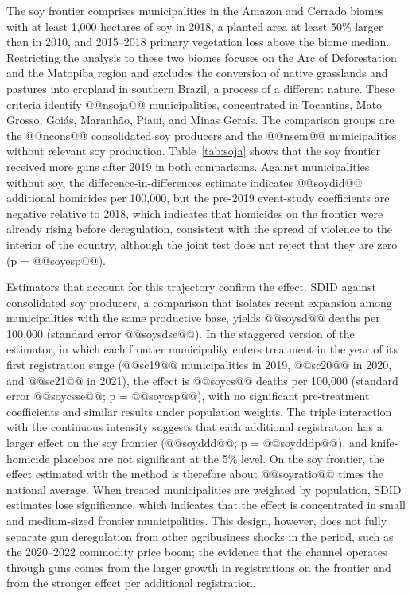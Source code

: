 \documentclass[11pt,a4paper]{article}
\begin{document}
The soy frontier comprises municipalities in the Amazon and Cerrado biomes with at least 1,000 hectares of soy in 2018, a planted area at least 50\% larger than in 2010, and 2015--2018 primary vegetation loss above the biome median. Restricting the analysis to these two biomes focuses on the Arc of Deforestation and the Matopiba region and excludes the conversion of native grasslands and pastures into cropland in southern Brazil, a process of a different nature. These criteria identify @@nsoja@@ municipalities, concentrated in Tocantins, Mato Grosso, Goiás, Maranhão, Piauí, and Minas Gerais. The comparison groups are the @@ncons@@ consolidated soy producers and the @@nsem@@ municipalities without relevant soy production. Table~\ref{tab:soja} shows that the soy frontier received more guns after 2019 in both comparisons. Against municipalities without soy, the difference-in-differences estimate indicates @@soydid@@ additional homicides per 100,000, but the pre-2019 event-study coefficients are negative relative to 2018, which indicates that homicides on the frontier were already rising before deregulation, consistent with the spread of violence to the interior of the country, although the joint test does not reject that they are zero (p = @@soyesp@@).

Estimators that account for this trajectory confirm the effect. SDID against consolidated soy producers, a comparison that isolates recent expansion among municipalities with the same productive base, yields @@soysd@@ deaths per 100,000 (standard error @@soysdse@@). In the staggered version of the \citet{callaway2021} estimator, in which each frontier municipality enters treatment in the year of its first registration surge (@@sc19@@ municipalities in 2019, @@sc20@@ in 2020, and @@sc21@@ in 2021), the effect is @@soycs@@ deaths per 100,000 (standard error @@soycsse@@; p = @@soycsp@@), with no significant pre-treatment coefficients and similar results under population weights. The triple interaction with the continuous intensity suggests that each additional registration has a larger effect on the soy frontier (@@soyddd@@; p = @@soydddp@@), and knife-homicide placebos are not significant at the 5\% level. On the soy frontier, the effect estimated with the \citet{callaway2021} method is therefore about @@soyratio@@ times the national average. When treated municipalities are weighted by population, SDID estimates lose significance, which indicates that the effect is concentrated in small and medium-sized frontier municipalities. This design, however, does not fully separate gun deregulation from other agribusiness shocks in the period, such as the 2020--2022 commodity price boom; the evidence that the channel operates through guns comes from the larger growth in registrations on the frontier and from the stronger effect per additional registration.
\end{document}
